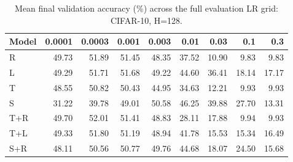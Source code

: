 \begin{table}[htbp]
\centering
\caption{Mean final validation accuracy (\%) across the full evaluation LR grid: CIFAR-10, H=128.}
\label{tab:lrmat:cifar10:128}
\scriptsize
\begin{tabular}{@{}lrrrrrrrr@{}}
\toprule
Model & 0.0001 & 0.0003 & 0.001 & 0.003 & 0.01 & 0.03 & 0.1 & 0.3 \\
\midrule
R & 49.73 & 51.89 & 51.45 & 48.35 & 37.52 & 10.90 & 9.83 & 9.83 \\
L & 49.29 & 51.71 & 51.68 & 49.22 & 44.60 & 36.41 & 18.14 & 17.17 \\
T & 48.55 & 50.82 & 50.43 & 44.95 & 34.63 & 12.21 & 9.93 & 9.93 \\
S & 31.22 & 39.78 & 49.01 & 50.58 & 46.25 & 39.88 & 27.70 & 13.31 \\
T+R & 49.70 & 52.01 & 51.41 & 48.83 & 28.11 & 17.88 & 9.94 & 9.93 \\
T+L & 49.33 & 51.80 & 51.19 & 48.94 & 41.78 & 15.53 & 15.34 & 16.49 \\
S+R & 48.11 & 50.56 & 50.77 & 49.76 & 44.68 & 18.07 & 24.50 & 15.68 \\
\bottomrule
\end{tabular}
\end{table}
